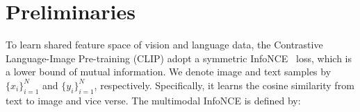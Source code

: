 \section{Preliminaries}
\label{subsec:pre}









To learn shared feature space of vision and language data, the Contrastive Language-Image Pre-training (CLIP)
\citep{radford2021learning} adopt a symmetric InfoNCE~\citep{oord2018representation} loss, which is a lower bound of mutual information.
We denote image and text samples by $\{x_i\}_{i=1}^{N}$ and $\{y_i\}_{i=1}^{N}$, respectively. 
Specifically, it learns the cosine similarity from text to image and vice verse. The multimodal InfoNCE is defined by:

